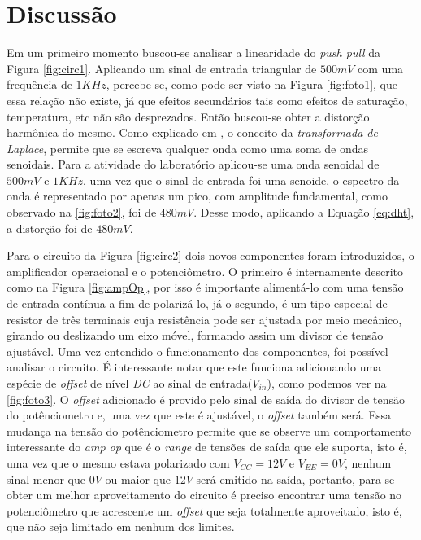 \section{Discussão} \label{sec:discussao}
    Em um primeiro momento buscou-se analisar a linearidade do \emph{push pull} da Figura \ref{fig:circ1}. Aplicando um sinal de entrada triangular de $500mV$ com uma frequência de $1KHz$, percebe-se, como pode ser visto na Figura \ref{fig:foto1}, que essa relação não existe, já que efeitos secundários tais como efeitos de saturação, temperatura, etc não são desprezados. Então buscou-se obter a distorção harmônica do mesmo. Como explicado em \cite{Sedra2004}, o conceito da \emph{transformada de Laplace}, permite que se escreva qualquer onda como uma soma de ondas senoidais. Para a atividade do laboratório aplicou-se uma onda senoidal de $500mV$ e $1KHz$, uma vez que o sinal de entrada foi uma senoide, o espectro da onda é representado por apenas um pico, com amplitude fundamental, como observado na \ref{fig:foto2}, foi de $480mV$. Desse modo, aplicando a Equação \ref{eq:dht}, a distorção foi de $480mV$.
    
    Para o circuito da Figura \ref{fig:circ2} dois novos componentes foram introduzidos, o amplificador operacional e o potenciômetro. O primeiro é internamente descrito como na Figura \ref{fig:ampOp}, por isso é importante alimentá-lo com uma tensão de entrada contínua a fim de polarizá-lo, já o segundo, é um tipo especial de resistor de três terminais cuja resistência pode ser ajustada por meio mecânico, girando ou deslizando um eixo móvel, formando assim um divisor de tensão ajustável. Uma vez entendido o funcionamento dos componentes, foi possível analisar o circuito. É interessante notar que este funciona adicionando uma espécie de \emph{offset} de nível \emph{DC} ao sinal de entrada($V_{in}$), como podemos ver na \ref{fig:foto3}. O \emph{offset} adicionado é provido pelo sinal de saída do divisor de tensão do potênciometro e, uma vez que este é ajustável, o \emph{offset} também será. Essa mudança na tensão do potênciometro permite que se observe um comportamento interessante do \emph{amp op} que é o \emph{range} de tensões de saída que ele suporta, isto é, uma vez que o mesmo estava polarizado com $V_{CC}=12V$ e $V_{EE}=0V$, nenhum sinal menor que $0V$ ou maior que $12V$ será emitido na saída, portanto, para se obter um melhor aproveitamento do circuito é preciso encontrar uma tensão no potenciômetro que acrescente um \emph{offset} que seja totalmente aproveitado, isto é, que não seja limitado em nenhum dos limites.
    
